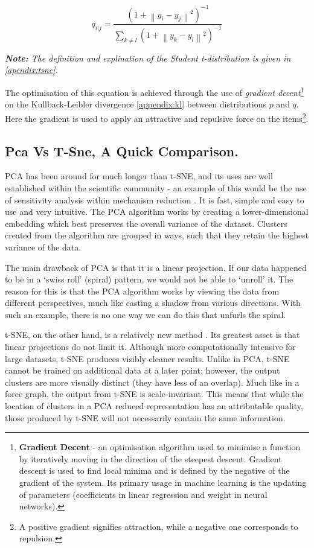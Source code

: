 \begin{equation}
q_{i|j} =\frac{(1 + \left \| y_i - y_j \right \|^2 )^{-1}}{\sum_{k \neq l} (1 + \left \| y_k - y_l \right \|^2 )^{-1} }
\end{equation}

\emph{\textbf{Note:} The definition and explination of the Student t-distribution is given in \autoref{apendix:tsne}.
}

The optimisation of this equation is achieved through the use of \emph{gradient decent}\footnote{\textbf{Gradient Decent} - an optimisation algorithm used to minimise a function by iteratively moving in the direction of the steepest descent. Gradient descent is used to find local minima and is defined by the negative of the gradient of the system. Its primary usage in machine learning is the updating of parameters (coefficients in linear regression and weight in neural networks).}
 on the Kullback-Leibler divergence \autoref{appendix:kl} between distributions $p$ and $q$. Here the gradient is used to apply an attractive and repulsive force on the items\footnote{A positive gradient signifies attraction, while a negative one corresponds to repulsion.}.




\subsection{Pca Vs T-Sne, A Quick Comparison.}

PCA has been around for much longer than t-SNE, and its uses are well established within the scientific community - an example of this would be the use of sensitivity analysis within mechanism reduction \citep{kinetics}. It is fast, simple and easy to use and very intuitive. The PCA algorithm works by creating a lower-dimensional embedding which best preserves the overall variance of the dataset. Clusters created from the algorithm are grouped in ways, such that they retain the highest variance of the data.

The main drawback of PCA is that it is a linear projection. If our data happened to be in a `swiss roll' (spiral) pattern, we would not be able to `unroll' it. The reason for this is that the PCA algorithm works by viewing the data from different perspectives, much like casting a shadow from various directions. With such an example, there is no one way we can do this that unfurls the spiral.

t-SNE, on the other hand, is a relatively new method \citep{tsne}. Its greatest asset is that linear projections do not limit it. Although more computationally intensive for large datasets, t-SNE produces visibly cleaner results. Unlike in PCA, t-SNE cannot be trained on additional data at a later point; however, the output clusters are more visually distinct (they have less of an overlap). Much like in a force graph, the output from t-SNE is scale-invariant. This means that while the location of clusters in a PCA reduced representation has an attributable quality, those produced by t-SNE will not necessarily contain the same information.

